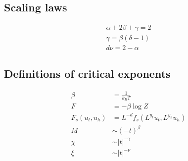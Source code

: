 \documentclass[a4paper]{article}
\begin{document}
\subsection{Scaling laws}
\begin{align}
	\alpha + 2\beta + \gamma = 2\\
	\gamma = \beta(\delta -1)\\
	d\nu = 2 - \alpha
\end{align}
\subsection{Definitions of critical exponents}
\begin{align}
  \beta &= \frac{1}{k_B T} \\
  F &= -\beta \log Z\\
  F_s(u_t,u_h) &= L^{-d}f_s(L^{y_t}u_t,L^{y_h}u_h)\\
  M &\sim (-t)^{\beta}\\
  \chi &\sim |t|^{-\gamma}\\
  \xi &\sim |t|^{-\nu}
\end{align}  
\end{document}
